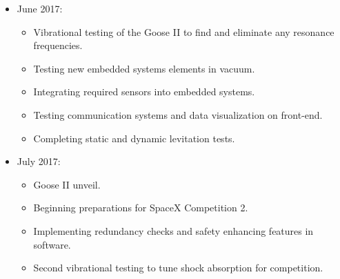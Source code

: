 \documentclass[11pt,a4paper,oldfontcommands]{memoir}
\begin{document}
\begin{itemize}
																																																					           \item June 2017:
																																																						       \begin{itemize}
																																																						               \item Vibrational testing of the Goose II to find and eliminate any resonance frequencies.
																																																							               \item Testing new embedded systems elements in vacuum.
																																																								               \item Integrating required sensors into embedded systems.
																																																									               \item Testing communication systems and data visualization on front-end.
																																																										               \item Completing static and dynamic levitation tests.
																																																											           \end{itemize}

																																																												           \item July 2017:
																																																													       \begin{itemize}
																																																													               \item Goose II unveil.
																																																														               \item Beginning preparations for SpaceX Competition 2.
																																																															               \item Implementing redundancy checks and safety enhancing features in software.
																																																																               \item Second vibrational testing to tune shock absorption for competition.
																																																																	           \end{itemize}


\end{itemize}
\end{document}
